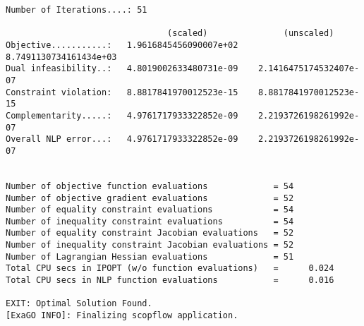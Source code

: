 \begin{lstlisting}
Number of Iterations....: 51

                                (scaled)               (unscaled)
Objective...........:   1.9616845456090007e+02    8.7491130734161434e+03
Dual infeasibility..:   4.8019002633480731e-09    2.1416475174532407e-07
Constraint violation:   8.8817841970012523e-15    8.8817841970012523e-15
Complementarity.....:   4.9761717933322852e-09    2.2193726198261992e-07
Overall NLP error...:   4.9761717933322852e-09    2.2193726198261992e-07


Number of objective function evaluations             = 54
Number of objective gradient evaluations             = 52
Number of equality constraint evaluations            = 54
Number of inequality constraint evaluations          = 54
Number of equality constraint Jacobian evaluations   = 52
Number of inequality constraint Jacobian evaluations = 52
Number of Lagrangian Hessian evaluations             = 51
Total CPU secs in IPOPT (w/o function evaluations)   =      0.024
Total CPU secs in NLP function evaluations           =      0.016

EXIT: Optimal Solution Found.
[ExaGO INFO]: Finalizing scopflow application.
\end{lstlisting}

